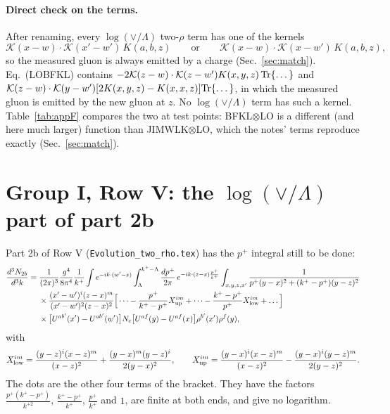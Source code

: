 \documentclass[10pt]{article}
\numberwithin{equation}{section}
\newcommand{\KK}{\mathcal K}
\newcommand{\Tr}{{\rm Tr}}
\begin{document}
\paragraph{Direct check on the terms.} After renaming, every $\log(\vee/\Lambda)$ two-$\rho$ term has one of the kernels
\begin{equation}
\KK(x-w)\cdot\KK(x'-w')\,K(a,b,z)\qquad\text{or}\qquad \KK(x-w)\cdot\KK(x-w')\,K(a,b,z),
\end{equation}
so the measured gluon is always emitted by a charge (Sec.~\ref{sec:match}). Eq.~(LOBFKL) contains $-2\KK(z-w)\cdot\KK(z-w')K(x,y,z)\,\Tr\{\dots\}$ and $\KK(z-w)\cdot\KK(y-w')[2K(x,y,z)-K(x,x,z)]\Tr\{\dots\}$, in which the measured gluon is emitted by the new gluon at $z$. No $\log(\vee/\Lambda)$ term has such a kernel. Table~\ref{tab:appF} compares the two at test points: BFKL$\otimes$LO is a different (and here much larger) function than JIMWLK$\otimes$LO, which the notes' terms reproduce exactly (Sec.~\ref{sec:match}).

\section{Group I, Row V: the \texorpdfstring{$\log(\vee/\Lambda)$}{log} part of part 2b}\label{sec:rowV}
Part 2b of Row V (\texttt{Evolution\_two\_rho.tex}) has the $p^+$ integral still to be done:
\begin{align}
\frac{d^3N_{2b}}{d^3k}={}&\frac{1}{(2\pi)^3}\frac{g^4}{8\pi^4}\frac1{k^+}\int e^{-ik\cdot(w'-z)}\int_\Lambda^{k^+-\Lambda}\frac{dp^+}{2\pi}\,e^{-ik\cdot(z-x)\frac{p^+}{k^+}}\int_{x,y,z,x'}\frac{1}{p^+(y-x)^2+(k^+-p^+)(y-z)^2}\notag\\
&\times\frac{(x'-w')^i(z-x)^m}{(x'-w')^2(z-x)^2}\Big[\dots-\frac{p^+}{k^+-p^+}X^{im}_{\rm up}+\dots-\frac{k^+-p^+}{p^+}X^{im}_{\rm low}+\dots\Big]\notag\\
&\times\big[U^{ab'}(x')-U^{ab'}(w')\big]N_c\big[U^{af}(y)-U^{af}(x)\big]\rho^{b'}(x')\rho^f(y),
\end{align}
with
\begin{equation}
X^{im}_{\rm low}=\frac{(y-z)^i(x-z)^m}{(x-z)^2}+\frac{(y-x)^m(y-z)^i}{2(y-x)^2},\qquad X^{im}_{\rm up}=\frac{(y-x)^i(x-z)^m}{(x-z)^2}-\frac{(y-x)^i(y-z)^m}{2(y-z)^2}.
\end{equation}
The dots are the other four terms of the bracket. They have the factors $\frac{p^+(k^+-p^+)}{k^{+2}}$, $\frac{k^+-p^+}{k^+}$, $\frac{p^+}{k^+}$ and $1$, are finite at both ends, and give no logarithm.
\end{document}
